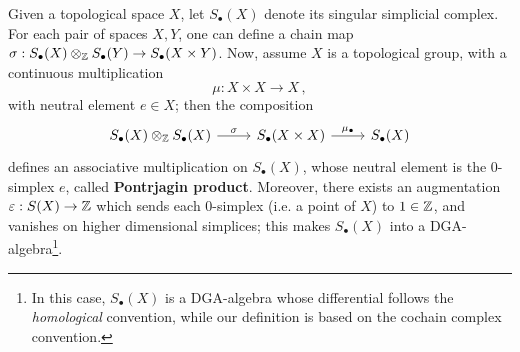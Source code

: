 	\begin{ex}
		Given a topological space $X$, let $S_{\bullet}(X)$ denote its
		singular simplicial complex. For each pair of spaces $X,Y$,
		one can define a chain map 
		$\sigma : S_{\bullet}(X) \otimes_{{\mathbb Z}} S_{\bullet}(Y) \to S_{\bullet}(X \times Y)$.
		Now, assume $X$ is a topological group, 
		with a continuous multiplication
		\begin{equation*}
			\mu: X \times X \longrightarrow X\,,
		\end{equation*}
		with neutral element $e \in X$;
		then the composition
		\begin{equation*}
			\begin{tikzcd}
				S_{\bullet}(X) \otimes_{\Z} S_{\bullet}(X) \ar[r, "\sigma"]
				& S_{\bullet}(X \times X) \ar[r, "\mu_{\bullet}"]
				& S_{\bullet}(X)
			\end{tikzcd}
		\end{equation*}
		defines an associative multiplication on $S_{\bullet}(X)$,
		whose neutral element is the $0$-simplex $e$,
		called \textbf{Pontrjagin product}.
		Moreover, there exists an augmentation $\varepsilon : S(X) \to {\mathbb Z}$
		which sends each $0$-simplex (i.e. a point of $X$) to $1 \in {\mathbb Z}$,
		and vanishes on higher dimensional simplices;
		this makes $S_{\bullet}(X)$ into a DGA-algebra\footnote{In this case, $S_{\bullet}(X)$ is a
		DGA-algebra whose differential follows the \emph{homological} convention,
		while our definition is based on the cochain complex convention.}.
	\end{ex}
	
